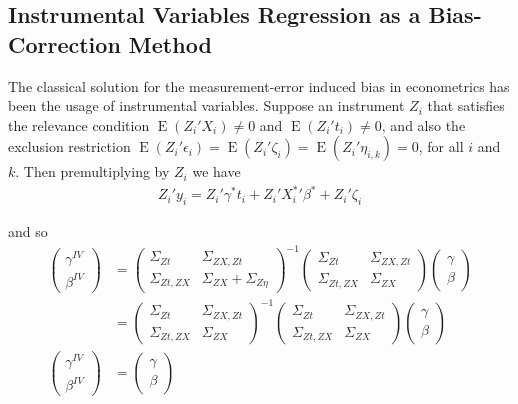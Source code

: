 \documentclass[12pt]{article}
\begin{document}
    \subsection*{Instrumental Variables Regression as a Bias-Correction Method}

        The classical solution for the measurement-error induced bias in econometrics has been the usage of instrumental variables. Suppose an instrument $Z_i$ that satisfies the relevance condition $\operatorname{E}(Z_i'X_i)\neq 0$ and $\operatorname{E}(Z_i't_i)\neq 0$, and also the exclusion restriction $\operatorname{E}(Z_i'\epsilon_i)=\operatorname{E}(Z_i'\zeta_i)=\operatorname{E}(Z_i'\eta_{i,k})=0$, for all $i$ and $k$. Then premultiplying by $Z_i$ we have
        \begin{align}
            Z_i'y_i =  Z_i'\gamma^* t_i +  Z_i'{X^{*}_i}' \beta^* +  Z_i'\zeta_i
        \end{align}

        and so
        \begin{align}
            \left(\begin{array}{l}
        {\gamma}^{IV} \\
        {\beta}^{IV}
        \end{array}\right)
        & =\left(\begin{array}{cc}
        {\Sigma}_{Zt} & \Sigma_{ZX,Zt} \\
        \Sigma_{Zt,ZX}& {\Sigma}_{ZX}+{\Sigma}_{Z\eta}
        \end{array}\right)^{-1}\left(\begin{array}{cc}
        {\Sigma}_{Zt} & \Sigma_{ZX,Zt} \\
        \Sigma_{Zt,ZX} & {\Sigma}_{ZX}
        \end{array}\right)\left(\begin{array}{l}
        {\gamma} \\
        {\beta}
        \end{array}\right)\\
        & =\left(\begin{array}{cc}
        {\Sigma}_{Zt} & \Sigma_{ZX,Zt} \\
        \Sigma_{Zt,ZX}& {\Sigma}_{ZX}
        \end{array}\right)^{-1}\left(\begin{array}{cc}
        {\Sigma}_{Zt} & \Sigma_{ZX,Zt} \\
        \Sigma_{Zt,ZX} & {\Sigma}_{ZX}
        \end{array}\right)\left(\begin{array}{l}
        {\gamma} \\
        {\beta}
        \end{array}\right) \\
        \left(\begin{array}{l}
        {\gamma}^{IV} \\
        {\beta}^{IV}
        \end{array}\right)
        & =\left(\begin{array}{l}
        {\gamma} \\
        {\beta}
        \end{array}\right)
        \end{align}
\end{document}
